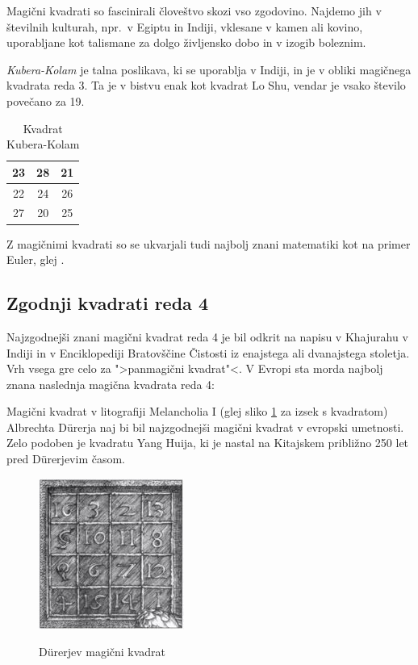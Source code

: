 \documentclass[a4paper,12pt]{article}
\begin{document}
Magični kvadrati so fascinirali človeštvo skozi vso zgodovino. Najdemo jih
v številnih kulturah, npr.\ v Egiptu in Indiji, vklesane v kamen ali
kovino, uporabljane kot talismane za dolgo življensko dobo in v
izogib boleznim.

\emph{Kubera-Kolam} je talna poslikava, ki se uporablja v Indiji, in je v
obliki magičnega kvadrata reda 3. Ta je v bistvu enak kot kvadrat
Lo Shu, vendar je vsako število povečano za 19.

\begin{table}[ht!]
   \centering
   \large
   \caption{Kvadrat Kubera-Kolam}
   \begin{tabular}{|c|c|c|}
      \hline
      23 & 28 & 21 \\\hline
      22 & 24 & 26 \\\hline
      27 & 20 & 25 \\\hline
   \end{tabular}
   \label{table:kubera}
\end{table}


Z magičnimi kvadrati so se ukvarjali tudi najbolj znani matematiki kot na
primer Euler, glej \cite{euler}. 


\subsection{Zgodnji kvadrati reda 4}

Najzgodnejši znani magični kvadrat reda 4 je bil odkrit na napisu
v Khajurahu v Indiji in v Enciklopediji Bratovščine Čistosti iz enajstega
ali dvanajstega stoletja. Vrh vsega gre celo za ">panmagični kvadrat"<.
V Evropi sta morda najbolj znana naslednja magična kvadrata reda 4:

Magični kvadrat v litografiji Melancholia I (glej sliko \ref{fig:durer}
za izsek s kvadratom) Albrechta Dürerja naj bi bil najzgodnejši magični kvadrat
v evropski umetnosti. Zelo podoben je kvadratu Yang Huija, ki je nastal na Kitajskem
približno 250 let pred Dürerjevim časom.

\begin{figure}[h!]
   \centering
   \caption{Dürerjev magični kvadrat}
   \includegraphics[scale=1.5]{durer.png}
   \label{fig:durer}
\end{figure}
\end{document}
